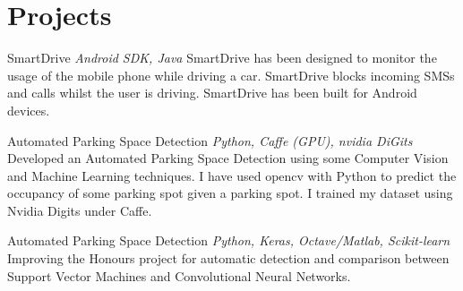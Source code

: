 \documentclass[letterpaper]{moderncv}        %
\begin{document}
\section{Projects}
\cventry
{}
{SmartDrive}
{}
{\textit{Android SDK, Java}}
{}
{SmartDrive has been designed to monitor the usage of the mobile phone while driving a car. SmartDrive blocks incoming SMSs and calls whilst the user is driving. SmartDrive has been built for Android devices.\\}

		\cventry
		{}
		{Automated Parking Space Detection}
		{}
		{\textit{Python, Caffe (GPU), nvidia DiGits}}
		{}
		{Developed an Automated Parking Space Detection using some Computer Vision and Machine Learning techniques. I have used opencv with Python to predict the occupancy of some parking spot given a parking spot. I trained my dataset using Nvidia Digits under Caffe.\\}

			\cventry
			{}
			{Automated Parking Space Detection}
			{}
			{\textit{Python, Keras, Octave/Matlab, Scikit-learn}}
			{}
			{Improving the Honours project for automatic detection and comparison between Support Vector Machines and Convolutional Neural Networks.\\}

				
\end{document}
